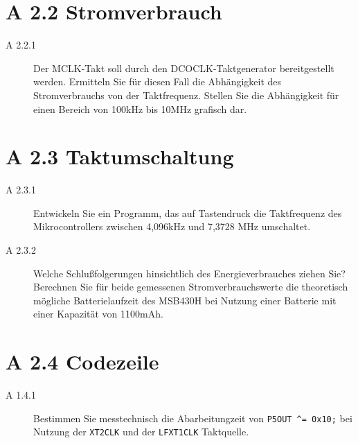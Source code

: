 \documentclass[11pt,a4paper,ngerman]{article}
\begin{document}
\newpage
\section*{A 2.2 Stromverbrauch}

\begin{description}
	\item[A 2.2.1] Der MCLK-Takt soll durch den DCOCLK-Taktgenerator bereitgestellt werden. Ermitteln Sie für diesen Fall die Abhängigkeit des Stromverbrauchs von der Taktfrequenz. Stellen Sie die Abhängigkeit für einen Bereich von 100kHz bis 10MHz grafisch dar. 
	
\end{description}


\section*{A 2.3 Taktumschaltung}
\begin{description}
\item[A 2.3.1] Entwickeln Sie ein Programm, das auf Tastendruck die Taktfrequenz des Mikrocontrollers zwischen 4,096kHz und 7,3728 MHz umschaltet.
\item[A 2.3.2] Welche Schlußfolgerungen hinsichtlich des Energieverbrauches ziehen Sie? Berechnen Sie für beide gemessenen Stromverbrauchswerte die theoretisch mögliche Batterielaufzeit des MSB430H bei Nutzung einer Batterie mit einer Kapazität von 1100mAh. 

\end{description}


\section*{A 2.4 Codezeile}
\begin{description}
\item[A 1.4.1]Bestimmen Sie messtechnisch die Abarbeitungzeit von \texttt{P5OUT \textasciicircum = 0x10;} bei Nutzung der \texttt{XT2CLK} und der \texttt{LFXT1CLK} Taktquelle.
        
\end{description}
\label{LastPage}
\end{document}
